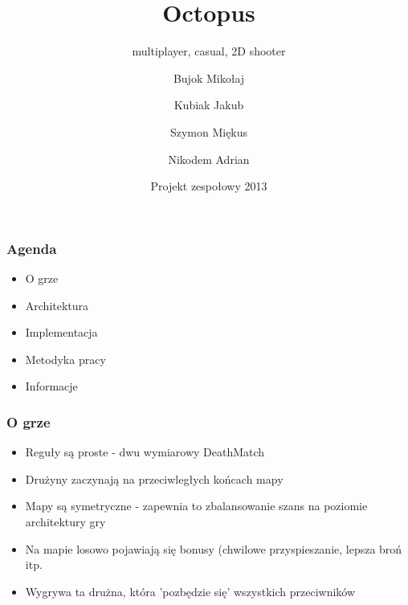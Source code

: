 \documentclass{beamer}
\title
{Octopus}
\subtitle{multiplayer, casual, 2D shooter}
\author[]
{Bujok Mikołaj \and Kubiak Jakub \\ \and Szymon Miękus\and Nikodem Adrian}
\date[\today]
{Projekt zespołowy 2013}
\begin{document}
\frame{\titlepage}
\begin{frame}
  \frametitle{Agenda}
  \begin{itemize}
  \item O grze
  \item Architektura
  \item Implementacja
  \item Metodyka pracy
  \item Informacje
  \end{itemize}
\end{frame}

\begin{frame}
  \frametitle{O grze}
  \begin{itemize}
    \item Reguły są proste - dwu wymiarowy DeathMatch
    \item Drużyny zaczynają na przeciwległych końcach mapy
    \item Mapy są symetryczne - zapewnia to zbalansowanie
          szans na poziomie architektury gry
    \item Na mapie losowo pojawiają się bonusy (chwilowe przyspieszanie, lepsza broń itp.
    \item Wygrywa ta drużna, która 'pozbędzie się' wszystkich przeciwników
  \end{itemize}
\end{frame}
\end{document}
